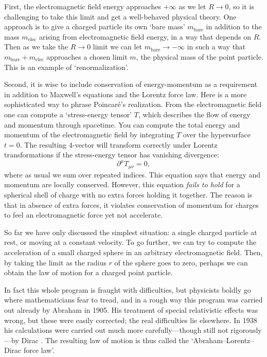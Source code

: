 \documentclass{article}
\newcommand{\bare}{\mathrm{bare}}
\newcommand{\elec}{\mathrm{elec}}
\begin{document}
First, the electromagnetic field energy approaches $+\infty$ as we let $R \to 0$, so it is challenging to take this limit and get a well-behaved physical theory.  One approach is to give a charged particle its own `bare mass' $m_\bare$ in addition to the mass $m_\elec$ arising from electromagnetic field energy, in a way that depends on $R$.  Then as we take the $R \to 0$ limit we can let $m_\bare \to -\infty$ in such a way that $m_\bare + m_\elec$ approaches a chosen limit $m$, the physical mass of the point particle.  This is an example of `renormalization'.

Second, it is wise to include conservation of energy-momentum as a requirement in addition to Maxwell's equations and the Lorentz force law.   Here is a more sophisticated way to phrase Poincar\'e's realization.  From the electromagnetic field one can compute a `stress-energy tensor' $T$, which describes the flow of energy and momentum through spacetime.   You can compute the total energy and momentum of the electromagnetic field by integrating $T$ over the hypersurface $t = 0$.  The resulting 4-vector will transform correctly under Lorentz transformations if the stress-energy tensor has vanishing divergence:
\[ \partial^\mu T_{\mu \nu} = 0 , \] 
where as usual we sum over repeated indices.  This equation says that energy and momentum are locally conserved.  However, this equation \emph{fails to hold} for a spherical shell of charge with no extra forces holding it together.  The reason is that in absence of extra forces, it violates conservation of momentum for charges to feel an electromagnetic force yet not accelerate.

So far we have only discussed the simplest situation: a single charged particle at rest, or moving at a constant velocity.  To go further, we can try to compute the acceleration of a small charged sphere in an arbitrary electromagnetic field.  Then, by taking the limit as the radius $r$ of the sphere goes to zero, perhaps we can obtain the law of motion for a charged point particle.   

In fact this whole program is fraught with difficulties, but physicists boldly go where
mathematicians fear to tread, and in a rough way this program was carried out already by Abraham \cite{Abraham1905} in 1905.  His treatment of special relativistic effects was wrong, but these were easily corrected; the real difficulties lie elsewhere.  In 1938 his calculations were carried out much more carefully---though still not rigorously---by Dirac \cite{Dirac}.  The resulting law of motion is thus called the `Abraham--Lorentz--Dirac force law'.
\end{document}
